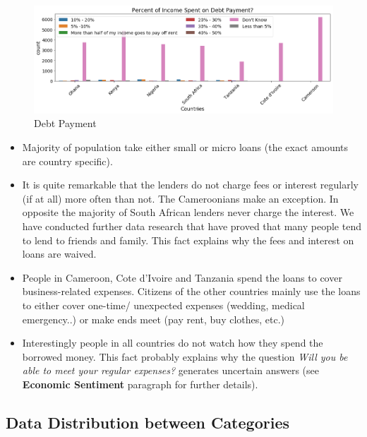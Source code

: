 \begin{Schunk}
\begin{figure}[H]

{\centering \includegraphics[width=1.15\linewidth]{../../artifacts/payment} 

}

\caption[Debt Payment]{Debt Payment}\label{fig:dtp}
\end{figure}
\end{Schunk}

\begin{itemize}
\tightlist
\item
  Majority of population take either small or micro loans (the exact
  amounts are country specific).
\item
  It is quite remarkable that the lenders do not charge fees or interest
  regularly (if at all) more often than not. The Cameroonians make an
  exception. In opposite the majority of South African lenders never
  charge the interest. We have conducted further data research that have
  proved that many people tend to lend to friends and family. This fact
  explains why the fees and interest on loans are waived.
\item
  People in Cameroon, Cote d'Ivoire and Tanzania spend the loans to
  cover business-related expenses. Citizens of the other countries
  mainly use the loans to either cover one-time/ unexpected expenses
  (wedding, medical emergency..) or make ends meet (pay rent, buy
  clothes, etc.)
\item
  Interestingly people in all countries do not watch how they spend the
  borrowed money. This fact probably explains why the question
  \emph{Will you be able to meet your regular expenses?} generates
  uncertain answers (see \textbf{Economic Sentiment} paragraph for
  further details).
\end{itemize}

\hypertarget{data-distribution-between-categories}{%
\subsection{Data Distribution between
Categories}\label{data-distribution-between-categories}}

